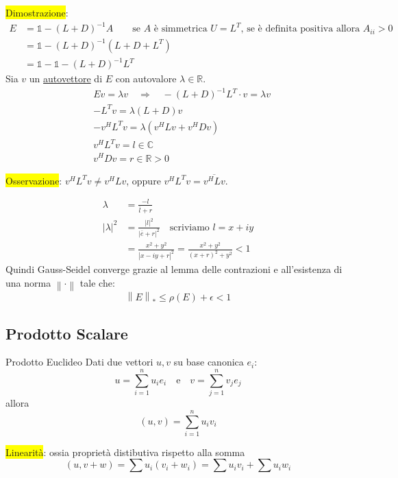 \documentclass{article}
\begin{document}
\colorbox{yellow}{Dimostrazione}:
\begin{align*}
    E & =\mathbb 1-\left(L+D\right)^{-1}A\qquad\text{se $A$ è simmetrica $U=L^T$, se è definita positiva allora $A_{ii}>0$} \\
      & =\mathbb 1-\left(L+D\right)^{-1}\left(L+D+L^T\right)                                                                \\
      & =\mathbb 1-\mathbb 1-\left(L+D\right)^{-1}L^T
\end{align*}
Sia $v$ un \underline{autovettore} di $E$ con autovalore $\lambda\in\mathbb R$.
\begin{align*}
     & Ev=\lambda v\quad\Rightarrow\quad -\left(L+D\right)^{-1}L^T\cdot v=\lambda v \\
     & -L^Tv=\lambda\left(L+D\right)v                                               \\
     & -v^HL^Tv=\lambda\left(v^HLv+v^HDv\right)                                     \\
     & v^HL^Tv=l\in\mathbb C                                                        \\
     & v^HDv=r\in\mathbb R>0
\end{align*}

\colorbox{yellow}{Osservazione}: $v^HL^Tv\ne v^HLv$, oppure $v^HL^Tv=\overline{v^HLv}$.

\begin{align*}
    \lambda                & =\frac{-l}{\overline{l}+r}                                                           \\
    \left|\lambda\right|^2 & =\frac{\left|l\right|^2}{\left|\overline{e}+r\right|^2}\quad \text{scriviamo }l=x+iy \\
                           & =\frac{x^2+y^2}{\left|x-iy+r\right|^2}=\frac{x^2+y^2}{\left(x+r\right)^2+y^2}<1
\end{align*}
Quindi Gauss-Seidel converge grazie al lemma delle contrazioni e all'esistenza di una norma $\left\|\cdot\right\|$ tale che:
\[\left\|E\right\|_\ast\le\rho(E)+\epsilon<1\]

\subsection{Prodotto Scalare}
\begin{defi}{Prodotto Euclideo}{}
    Dati due vettori $u,v$ su base canonica $e_i$:
    \[u = \sum_{i=1}^n u_i e_i \quad \text{e} \quad v = \sum_{j=1}^n v_j e_j\]
    allora
    \[\left(u,v\right)=\sum_{i=1}^{n}u_iv_i\]
\end{defi}
\colorbox{yellow}{Linearità}: ossia proprietà distibutiva rispetto alla somma
\[(u, v+w) = \sum u_i(v_i + w_i) = \sum u_i v_i + \sum u_i w_i\]
\end{document}
